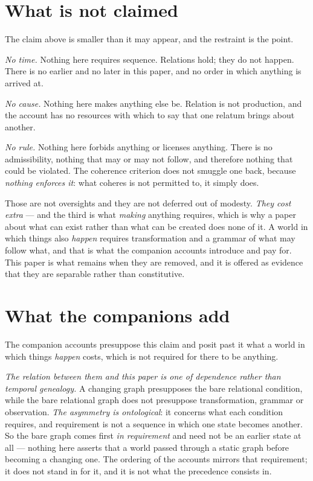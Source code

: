 \documentclass[11pt,a4paper]{article}
\begin{document}
\section{What is not claimed}\label{sec:not-claimed}
The claim above is smaller than it may appear, and the restraint is the point.

\emph{No time.} Nothing here requires sequence. Relations hold; they do not happen. There is no earlier
and no later in this paper, and no order in which anything is arrived at.

\emph{No cause.} Nothing here makes anything else be. Relation is not production, and the account has no
resources with which to say that one relatum brings about another.

\emph{No rule.} Nothing here forbids anything or licenses anything. There is no admissibility, nothing
that may or may not follow, and therefore nothing that could be violated. The coherence criterion does
not smuggle one back, because \emph{nothing enforces it}: what coheres is not permitted to, it simply
does.

Those are not oversights and they are not deferred out of modesty. \emph{They cost extra} --- and the third is what \emph{making} anything requires, which is why a paper
about what can exist rather than what can be created does none of it. A world
in which things also \emph{happen} requires transformation and a grammar of what may follow what, and
that is what the companion accounts introduce and pay for. This paper is what remains when they are
removed, and it is offered as evidence that they are separable rather than constitutive.

\section{What the companions add}\label{sec:companions}
The companion accounts presuppose this claim and posit past it what a world in which things
\emph{happen} costs, which is not required for there to be anything.

\emph{The relation between them and this paper is one of dependence rather than temporal genealogy.}
A changing graph presupposes the bare relational condition, while the bare relational graph does not
presuppose transformation, grammar or observation. \emph{The asymmetry is ontological}: it concerns
what each condition requires, and requirement is not a sequence in which one state becomes another. So
the bare graph comes first \emph{in requirement} and need not be an earlier state at all --- nothing
here asserts that a world passed through a static graph before becoming a changing one. The ordering of
the accounts mirrors that requirement; it does not stand in for it, and it is not what the precedence
consists in.
\end{document}
